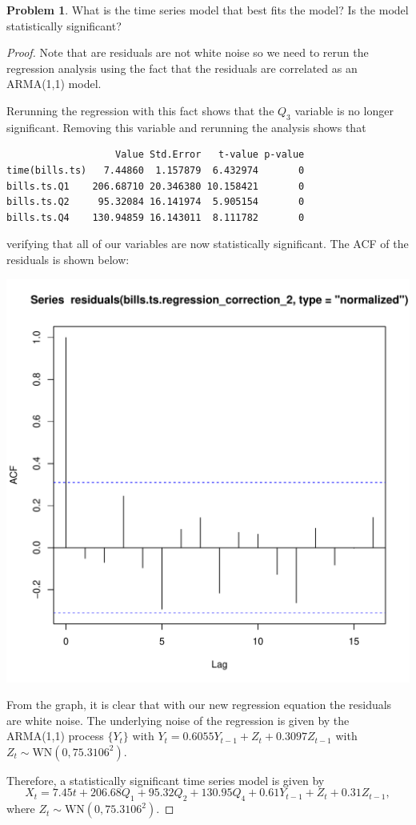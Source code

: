 \documentclass[12pt]{article}
\theoremstyle{definition}
\newtheorem{problem}{Problem}
\begin{document}
\begin{problem}
  What is the time series model that best fits the model? Is the model statistically significant?
\end{problem}

\begin{proof}

Note that are residuals are not white noise so we need to rerun the regression
analysis using the fact that the residuals are correlated as an ARMA(1,1) model.

Rerunning the regression with this fact shows that the $Q_3$ variable is no longer
significant. Removing this variable and rerunning the analysis shows that

\begin{verbatim}
                   Value Std.Error   t-value p-value
time(bills.ts)   7.44860  1.157879  6.432974       0
bills.ts.Q1    206.68710 20.346380 10.158421       0
bills.ts.Q2     95.32084 16.141974  5.905154       0
bills.ts.Q4    130.94859 16.143011  8.111782       0

\end{verbatim}

verifying that all of our variables are now statistically significant. The ACF
of the residuals is shown below:

\begin{center}
  \includegraphics[scale=0.6]{new_residuals_acf}
\end{center}
From the graph, it is clear that with our new regression equation the residuals are white noise.
The underlying noise of the regression is given by the ARMA(1,1) process $\{Y_t\}$
with $Y_t = 0.6055 Y_{t-1} + Z_t + 0.3097Z_{t-1}$ with $Z_t \sim \text{WN}(0, 75.3106^2)$.

Therefore, a statistically significant time series model is given by
\[
  X_t = 7.45t + 206.68Q_1 + 95.32Q_2 + 130.95Q_4 + 0.61 Y_{t-1} + Z_t + 0.31Z_{t-1},
\]
where $Z_t \sim \text{WN}(0, 75.3106^2)$.
\end{proof}
\end{document}
